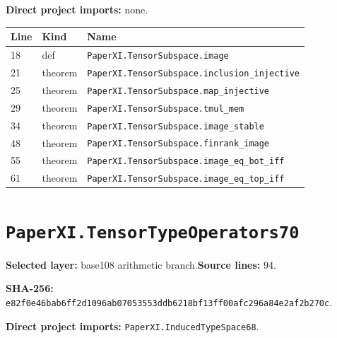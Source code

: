 \documentclass[10pt,oneside]{book}
\begin{document}

\textbf{Direct project imports:} none.

\begin{longtable}{@{}p{}p{}p{}@{}}\toprule Line&Kind&Name\\\midrule\endhead

18&def&\nolinkurl{PaperXI.TensorSubspace.image}\\

21&theorem&\nolinkurl{PaperXI.TensorSubspace.inclusion_injective}\\

25&theorem&\nolinkurl{PaperXI.TensorSubspace.map_injective}\\

29&theorem&\nolinkurl{PaperXI.TensorSubspace.tmul_mem}\\

34&theorem&\nolinkurl{PaperXI.TensorSubspace.image_stable}\\

48&theorem&\nolinkurl{PaperXI.TensorSubspace.finrank_image}\\

55&theorem&\nolinkurl{PaperXI.TensorSubspace.image_eq_bot_iff}\\

61&theorem&\nolinkurl{PaperXI.TensorSubspace.image_eq_top_iff}\\

\bottomrule\end{longtable}

\section{\texorpdfstring{\nolinkurl{PaperXI.TensorTypeOperators70}}{PaperXI.TensorTypeOperators70}}\label{module:PaperXI.TensorTypeOperators70}

\textbf{Selected layer:} base108 arithmetic branch.\quad\textbf{Source lines:} 94.\par\textbf{SHA-256:} {\scriptsize\nolinkurl{e82f0e46bab6ff2d1096ab07053553ddb6218bf13ff00afc296a84e2af2b270c}}.


\textbf{Direct project imports:} \nolinkurl{PaperXI.InducedTypeSpace68}.
\end{document}
